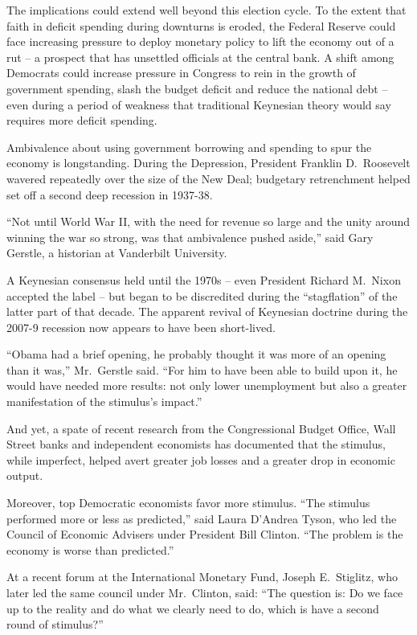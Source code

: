 ﻿\documentclass[12pt]{article}
\begin{document}
The implications could extend well beyond this election cycle. To the extent that faith in deficit
spending during downturns is eroded, the Federal Reserve could face increasing pressure to deploy
monetary policy to lift the economy out of a rut -- a prospect that has unsettled officials at the
central bank. A shift among Democrats could increase pressure in Congress to rein in the growth of
government spending, slash the budget deficit and reduce the national debt -- even during a period
of weakness that traditional Keynesian theory would say requires more deficit spending.

Ambivalence about using government borrowing and spending to spur the economy is longstanding.
During the Depression, President Franklin D.~Roosevelt wavered repeatedly over the size of the New
Deal; budgetary retrenchment helped set off a second deep recession in 1937-38.

``Not until World War II, with the need for revenue so large and the unity around winning the war so
strong, was that ambivalence pushed aside,'' said Gary Gerstle, a historian at Vanderbilt
University.

A Keynesian consensus held until the 1970s -- even President Richard M.~Nixon accepted the label --
but began to be discredited during the ``stagflation'' of the latter part of that decade. The
apparent revival of Keynesian doctrine during the 2007-9 recession now appears to have been
short-lived.

``Obama had a brief opening, he probably thought it was more of an opening than it was,''
Mr.~Gerstle said. ``For him to have been able to build upon it, he would have needed more results:
not only lower unemployment but also a greater manifestation of the stimulus's impact.''

And yet, a spate of recent research from the Congressional Budget Office, Wall Street banks and
independent economists has documented that the stimulus, while imperfect, helped avert greater job
losses and a greater drop in economic output.

Moreover, top Democratic economists favor more stimulus. ``The stimulus performed more or less as
predicted,'' said Laura D'Andrea Tyson, who led the Council of Economic Advisers under President
Bill Clinton. ``The problem is the economy is worse than predicted.''

At a recent forum at the International Monetary Fund, Joseph E.~Stiglitz, who later led the same
council under Mr.~Clinton, said: ``The question is: Do we face up to the reality and do what we
clearly need to do, which is have a second round of stimulus?''
\end{document}
